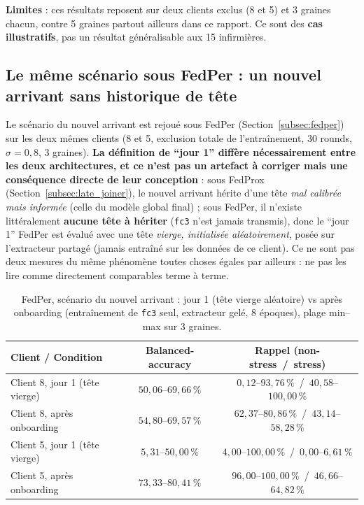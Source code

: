 \documentclass{article}
\begin{document}
\textbf{Limites} : ces résultats reposent sur deux clients exclus (8 et 5) et 3 graines
chacun, contre 5 graines partout ailleurs dans ce rapport. Ce sont des
\textbf{cas illustratifs}, pas un résultat généralisable aux 15 infirmières.

\subsection{Le même scénario sous FedPer : un nouvel arrivant sans historique de tête}
\label{subsec:fedper_late_joiner}

Le scénario du nouvel arrivant est rejoué sous FedPer (Section~\ref{subsec:fedper}) sur
les deux mêmes clients (8 et 5, exclusion totale de l'entraînement, 30 rounds,
$\sigma=0{,}8$, 3 graines). \textbf{La définition de ``jour 1'' diffère nécessairement
entre les deux architectures, et ce n'est pas un artefact à corriger mais une
conséquence directe de leur conception} : sous FedProx (Section~\ref{subsec:late_joiner}),
le nouvel arrivant hérite d'une tête \emph{mal calibrée mais informée} (celle du modèle
global final) ; sous FedPer, il n'existe littéralement \textbf{aucune tête à hériter}
(\texttt{fc3} n'est jamais transmis), donc le ``jour 1'' FedPer est évalué avec une tête
\emph{vierge, initialisée aléatoirement}, posée sur l'extracteur partagé (jamais
entraîné sur les données de ce client). Ce ne sont pas deux mesures du même phénomène
toutes choses égales par ailleurs : ne pas les lire comme directement comparables terme
à terme.

\begin{table}[h!]
  \centering
  \caption{FedPer, scénario du nouvel arrivant : jour 1 (tête vierge aléatoire) vs après
  onboarding (entraînement de \texttt{fc3} seul, extracteur gelé, 8 époques), plage
  min--max sur 3 graines.}
  \label{tab:fedper_late_joiner}
  \begin{tabular}{lcc}
    \toprule
    Client / Condition & Balanced-accuracy & Rappel (non-stress~/~stress) \\
    \midrule
    Client 8, jour 1 (tête vierge)   & $50{,}06$--$69{,}66\,\%$ & $0{,}12$--$93{,}76\,\%$~/~$40{,}58$--$100{,}00\,\%$ \\
    Client 8, après onboarding       & $54{,}80$--$69{,}57\,\%$ & $62{,}37$--$80{,}86\,\%$~/~$43{,}14$--$58{,}28\,\%$ \\
    \addlinespace
    Client 5, jour 1 (tête vierge)   & $5{,}31$--$50{,}00\,\%$  & $4{,}00$--$100{,}00\,\%$~/~$0{,}00$--$6{,}61\,\%$ \\
    Client 5, après onboarding       & $73{,}33$--$80{,}41\,\%$ & $96{,}00$--$100{,}00\,\%$~/~$46{,}66$--$64{,}82\,\%$ \\
    \bottomrule
  \end{tabular}
\end{table}
\end{document}

